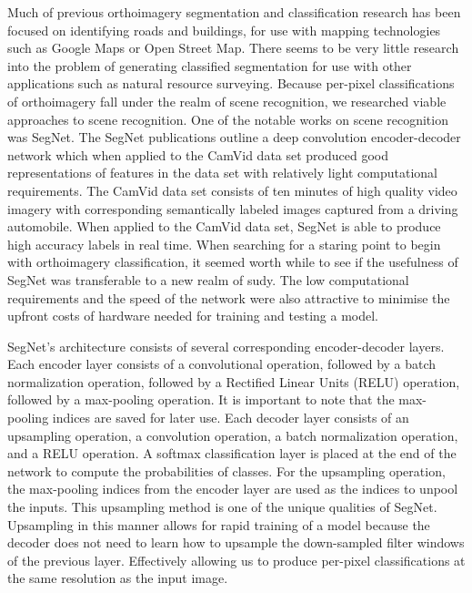 \documentclass[12pt]{article}
\begin{document}
Much of previous orthoimagery segmentation and classification research has been focused on identifying roads and buildings, for use with mapping technologies such as Google Maps or Open Street Map. There seems to be very little research into the problem of generating classified segmentation for use with other applications such as natural resource surveying. Because per-pixel classifications of orthoimagery fall under the realm of scene recognition, we researched viable approaches to scene recognition. One of the notable works on scene recognition was SegNet. The SegNet publications outline a deep convolution encoder-decoder network which when applied to the CamVid data set produced good representations of features in the data set with relatively light computational requirements. The CamVid data set consists of ten minutes of high quality video imagery with corresponding semantically labeled images captured from a driving automobile. When applied to the CamVid data set, SegNet is able to produce high accuracy labels in real time. When searching for a staring point to begin with orthoimagery classification, it seemed worth while to see if the usefulness of SegNet was transferable to a new realm of sudy. The low computational requirements and the speed of the network were also attractive to minimise the upfront costs of hardware needed for training and testing a model.

SegNet's architecture\cite{SegNet} consists of several corresponding encoder-decoder layers. Each encoder layer consists of a convolutional operation, followed by a batch normalization operation, followed by a Rectified Linear Units (RELU) operation, followed by a max-pooling operation. It is important to note that the max-pooling indices are saved for later use. Each decoder layer consists of an upsampling operation, a convolution operation, a batch normalization operation, and a RELU operation. A softmax classification layer is placed at the end of the network to compute the probabilities of classes. For the upsampling operation, the max-pooling indices from the encoder layer are used as the indices to unpool the inputs. This upsampling method is one of the unique qualities of SegNet. Upsampling in this manner allows for rapid training of a model because the decoder does not need to learn how to upsample the down-sampled filter windows of the previous layer. Effectively allowing us to produce per-pixel classifications at the same resolution as the input image.


\newpage
\end{document}
